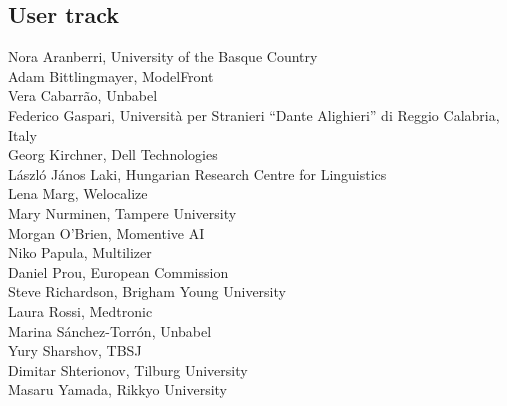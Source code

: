 \documentclass[a4paper,11pt,twoside]{book}
\begin{document}
\pagebreak

\subsection*{User track}

\noindent Nora Aranberri, University of the Basque Country\\
\noindent Adam Bittlingmayer, ModelFront\\
\noindent Vera Cabarrão, Unbabel\\
\noindent Federico Gaspari, Università per Stranieri ``Dante Alighieri'' di Reggio Calabria, Italy\\
\noindent Georg Kirchner, Dell Technologies\\
\noindent László János Laki, Hungarian Research Centre for Linguistics\\
\noindent Lena Marg, Welocalize\\
\noindent Mary Nurminen, Tampere University\\
\noindent Morgan O'Brien, Momentive AI\\
\noindent Niko Papula, Multilizer\\
\noindent Daniel Prou, European Commission\\
\noindent Steve Richardson, Brigham Young University\\
\noindent Laura Rossi, Medtronic\\
\noindent Marina Sánchez-Torrón, Unbabel\\
\noindent Yury Sharshov, TBSJ\\
\noindent Dimitar Shterionov, Tilburg University\\
\noindent Masaru Yamada, Rikkyo University\\



\clearpage
\end{document}
